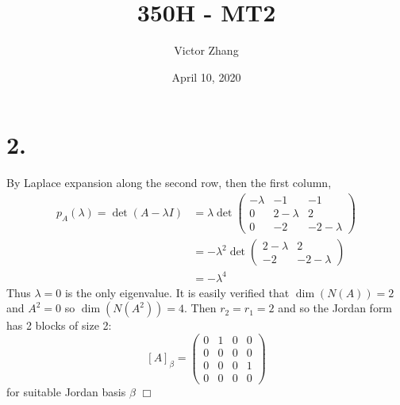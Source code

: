 \documentclass{article}
\title{350H - MT2}
\author{Victor Zhang}
\date{April 10, 2020}
\begin{document}
\maketitle

\section*{2.}
By Laplace expansion along the second row, then the first column,
\begin{equation*}
\begin{split}
    p_A(\lambda) = \det (A-\lambda I) &= \lambda \det \left( \begin{matrix} -\lambda & -1 & -1 \\ 0 & 2-\lambda & 2 \\ 0 & -2 & -2-\lambda \end{matrix} \right)\\
    &= -\lambda^2 \det \left( \begin{matrix} 2-\lambda & 2 \\ -2 & -2-\lambda \end{matrix} \right)\\
    &= -\lambda^4
\end{split}
\end{equation*}
Thus $\lambda = 0$ is the only eigenvalue. It is easily verified that $\dim (N(A)) = 2$ and $A^2 = 0$ so $\dim (N(A^2)) = 4$. Then $r_2 = r_1 = 2$ and so the Jordan form has 2 blocks of size 2:
$$\left[A\right]_\beta = \left( \begin{matrix} 0 & 1 & 0 & 0 \\ 0 & 0 & 0 & 0 \\ 0 & 0 & 0 & 1 \\ 0 & 0 & 0 & 0 \end{matrix} \right)$$
for suitable Jordan basis $\beta$ $\Box$
\end{document}
